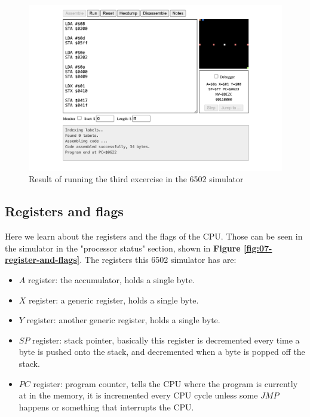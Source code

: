 \documentclass[a4paper]{article}
\begin{document}
\begin{figure}[H]
    \centering
    \includegraphics[width=1.0\textwidth]{res/images/q2/06-exercise-3.png}
    \caption{Result of running the third excercise in the 6502 simulator}
    \label{fig:06-exercise-3}
\end{figure}

\subsection{Registers and flags}

Here we learn about the registers and the flags of the CPU. Those can be seen in the simulator in the "processor status" section, shown in  \textbf{Figure \ref{fig:07-register-and-flags}}. The registers this 6502 simulator has are:

\begin{itemize}
    \item $A$ register: the accumulator, holds a single byte.
    \item $X$ register: a generic register, holds a single byte.
    \item $Y$ register: another generic register, holds a single byte.
    \item $SP$ register: stack pointer, basically this register is decremented every time a byte is pushed onto the stack, and decremented when a byte is popped off the stack.
    \item $PC$ register: program counter, tells the CPU where the program is currently at in the memory, it is incremented every CPU cycle unless some $JMP$ happens or something that interrupts the CPU.
\end{itemize}
\end{document}
